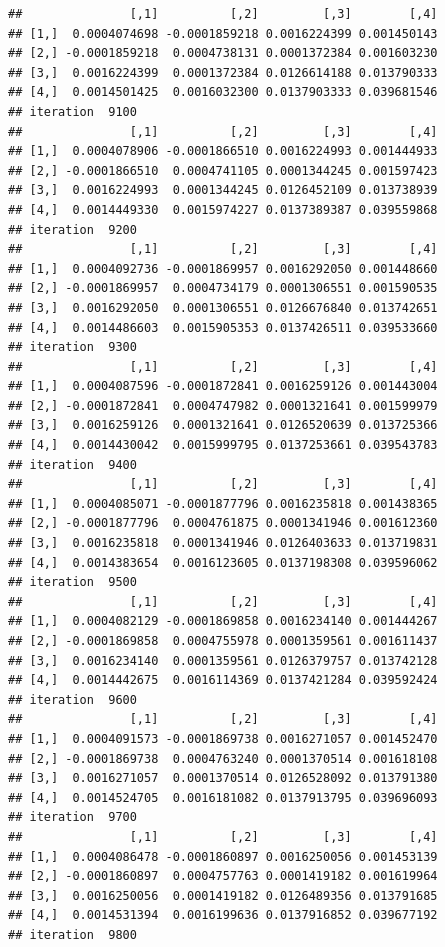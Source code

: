 \documentclass[
]{article}
\begin{document}
\begin{verbatim}
##               [,1]          [,2]         [,3]        [,4]
## [1,]  0.0004074698 -0.0001859218 0.0016224399 0.001450143
## [2,] -0.0001859218  0.0004738131 0.0001372384 0.001603230
## [3,]  0.0016224399  0.0001372384 0.0126614188 0.013790333
## [4,]  0.0014501425  0.0016032300 0.0137903333 0.039681546
## iteration  9100 
##               [,1]          [,2]         [,3]        [,4]
## [1,]  0.0004078906 -0.0001866510 0.0016224993 0.001444933
## [2,] -0.0001866510  0.0004741105 0.0001344245 0.001597423
## [3,]  0.0016224993  0.0001344245 0.0126452109 0.013738939
## [4,]  0.0014449330  0.0015974227 0.0137389387 0.039559868
## iteration  9200 
##               [,1]          [,2]         [,3]        [,4]
## [1,]  0.0004092736 -0.0001869957 0.0016292050 0.001448660
## [2,] -0.0001869957  0.0004734179 0.0001306551 0.001590535
## [3,]  0.0016292050  0.0001306551 0.0126676840 0.013742651
## [4,]  0.0014486603  0.0015905353 0.0137426511 0.039533660
## iteration  9300 
##               [,1]          [,2]         [,3]        [,4]
## [1,]  0.0004087596 -0.0001872841 0.0016259126 0.001443004
## [2,] -0.0001872841  0.0004747982 0.0001321641 0.001599979
## [3,]  0.0016259126  0.0001321641 0.0126520639 0.013725366
## [4,]  0.0014430042  0.0015999795 0.0137253661 0.039543783
## iteration  9400 
##               [,1]          [,2]         [,3]        [,4]
## [1,]  0.0004085071 -0.0001877796 0.0016235818 0.001438365
## [2,] -0.0001877796  0.0004761875 0.0001341946 0.001612360
## [3,]  0.0016235818  0.0001341946 0.0126403633 0.013719831
## [4,]  0.0014383654  0.0016123605 0.0137198308 0.039596062
## iteration  9500 
##               [,1]          [,2]         [,3]        [,4]
## [1,]  0.0004082129 -0.0001869858 0.0016234140 0.001444267
## [2,] -0.0001869858  0.0004755978 0.0001359561 0.001611437
## [3,]  0.0016234140  0.0001359561 0.0126379757 0.013742128
## [4,]  0.0014442675  0.0016114369 0.0137421284 0.039592424
## iteration  9600 
##               [,1]          [,2]         [,3]        [,4]
## [1,]  0.0004091573 -0.0001869738 0.0016271057 0.001452470
## [2,] -0.0001869738  0.0004763240 0.0001370514 0.001618108
## [3,]  0.0016271057  0.0001370514 0.0126528092 0.013791380
## [4,]  0.0014524705  0.0016181082 0.0137913795 0.039696093
## iteration  9700 
##               [,1]          [,2]         [,3]        [,4]
## [1,]  0.0004086478 -0.0001860897 0.0016250056 0.001453139
## [2,] -0.0001860897  0.0004757763 0.0001419182 0.001619964
## [3,]  0.0016250056  0.0001419182 0.0126489356 0.013791685
## [4,]  0.0014531394  0.0016199636 0.0137916852 0.039677192
## iteration  9800 

\end{verbatim}
\end{document}
